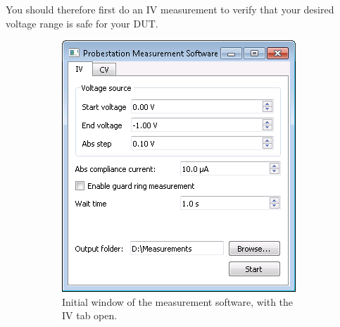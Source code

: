\documentclass[a4paper]{article}
\begin{document}
You should therefore first do an IV measurement to verify that your desired voltage range is safe for your DUT.\\

\begin{figure}[hbtp]
\centering
\begin{subfigure}[t]{0.475\textwidth}
\centering\captionsetup{width=.8\linewidth}%
\includegraphics[width=\linewidth]{pictures/softiv.png}
\caption[Software with the IV Tab]{Initial window of the measurement software, with the IV tab open.}
\label{fig:softwareopeniv}
\end{subfigure}
\begin{subfigure}[t]{0.475\textwidth}
\centering\captionsetup{width=.8\linewidth}%

\end{subfigure}
\end{figure}
\end{document}
